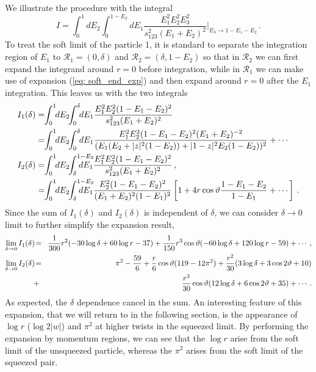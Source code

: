 \documentclass[letterpaper,11pt]{article}
\def\beq{\begin{equation}}
\def\eeq{\end{equation}}
\def\bea{\begin{eqnarray}}
\def\eea{\end{eqnarray}}
\def\nn{{\nonumber}}
\newcommand{\abs}[1]{\lvert#1\rvert}
\def\beq{\begin{equation}}
\def\eeq{\end{equation}}
\begin{document}
We illustrate the procedure with the integral
\beq
I=\int_{0}^{1}dE_2 \int_{0}^{1-E_2}  dE_1 \frac{E_1^2 E_2^2 E_3^2}{s_{123}^2(E_1+E_2)^2}\Bigg|_{E_3\to1-E_1-E_2}\,.
\eeq
To treat the soft limit of the particle 1, it is standard to separate the integration region of $E_1$ to $\mathcal{R}_1=(0,\delta)$ and $\mathcal{R}_2=(\delta,1-E_2)$ so that in $\mathcal{R}_2$ we can first expand the integrand around $r=0$ before integration, while in $\mathcal{R}_1$ we can make use of expansion (\ref{eq: soft_end_exp}) and then expand around $r=0$ after the $E_1$ integration. This leaves us with the two integrals
\begin{align}
I_1(\delta)&=\!\! \int_{0}^{1}\!\! dE_2 \!\! \int_{0}^{\delta}\!\! dE_1 \frac{E_1^2 E_2^2 (1-E_1-E_2)^2}{s_{123}^2(E_1+E_2)^2} \\
&=\!\! \int_{0}^{1}\!\! dE_2 \!\! \int_{0}^{\delta}\!\! dE_1\frac{E_1^2 E_2^2 (1-E_1-E_2)^2 (E_1+E_2)^{-2}}{ (E_1(E_2+\abs{z}^2(1-E_2))+\abs{1-z}^2 E_2(1-E_2))^{2}}+\cdots \nonumber\\
I_2(\delta)&=\!\! \int_{0}^{1}\!\! dE_2 \!\! \int_{\delta}^{1-E_2}\!\!\!\!\!\!\!\!\!\!\!\! dE_1 \frac{E_1^2 E_2^2 (1-E_1-E_2)^2}{s_{123}^2(E_1+E_2)^2}\,,\nn \\
&= \!\! \int_{0}^{1}\!\! dE_2 \!\! \int_{\delta}^{1-E_2}\!\!\!\!\!\!\!\!\!\!\!\! dE_1 \frac{E_2^2(1-E_1-E_2)^2}{(E_1+E_2)^2(1-E_1)^2}\left[1+ 4 r \cos\vartheta\frac{1-E_1-E_2}{1-E_1}+\cdots\right] \nonumber \,.
\end{align}
Since the sum of $I_1(\delta)$ and $I_2(\delta)$ is independent of $\delta$, we can consider $\delta \to 0$ limit to further simplify the expansion result, 
\bea
\lim_{\delta \to 0}I_1(\delta) \!&=&\! \frac{1}{300} r^2(-30 \log \delta +60 \log r-37) +\frac{1}{150} r^3 \cos \vartheta (-60 \log \delta+120 \log r-59)+\cdots\,,\nonumber\\
\lim_{\delta \to 0}I_2(\delta) \!&=&\!  \pi ^2-\frac{59}{6}+\frac{r}{6} \cos\vartheta(119-12 \pi ^2) +\frac{r^2}{30} (3 \log \delta+3 \cos 2 \vartheta+10)\nn \\
&+&\frac{r^3}{30}  \cos \vartheta (12 \log \delta+6 \cos 2 \vartheta+35)+\cdots\,.
\eea
As expected, the $\delta$ dependence cancel in the sum. 
An interesting feature of this expansion, that we will return to in the following section, is the appearance of $\log r$ ($\log 2\abs{w}$) and $\pi^2$ at higher twists in the squeezed limit. By performing the expansion by momentum regions, we can see that the $\log r$ arise from the soft limit of the unsqueezed particle, whereas the $\pi^2$ arises from the soft limit of the squeezed pair.
\end{document}
